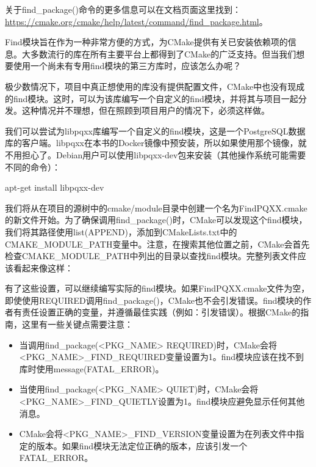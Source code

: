 关于find\_package()命令的更多信息可以在文档页面这里找到：\url{https://cmake.org/cmake/help/latest/command/find_package.html}。

Find模块旨在作为一种非常方便的方式，为CMake提供有关已安装依赖项的信息。大多数流行的库在所有主要平台上都得到了CMake的广泛支持。但当我们想要使用一个尚未有专用find模块的第三方库时，应该怎么办呢？


极少数情况下，项目中真正想使用的库没有提供配置文件，CMake中也没有现成的find模块。这时，可以为该库编写一个自定义的find模块，并将其与项目一起分发。这种情况并不理想，但在照顾到项目用户的情况下，必须这样做。

我们可以尝试为libpqxx库编写一个自定义的find模块，这是一个PostgreSQL数据库的客户端。libpqxx在本书的Docker镜像中预安装，所以如果使用那个镜像，就不用担心了。Debian用户可以使用libpqxx-dev包来安装（其他操作系统可能需要不同的命令）：

\begin{shell}
apt-get install libpqxx-dev
\end{shell}

我们将从在项目的源树中的cmake/module目录中创建一个名为FindPQXX.cmake的新文件开始。为了确保调用find\_package()时，CMake可以发现这个find模块，我们将其路径使用list(APPEND)，添加到CMakeLists.txt中的CMAKE\_MODULE\_PATH变量中。注意，在搜索其他位置之前，CMake会首先检查CMAKE\_MODULE\_PATH中列出的目录以查找find模块。完整列表文件应该看起来像这样：



有了这些设置，可以继续编写实际的find模块。如果FindPQXX.cmake文件为空，即使使用REQUIRED调用find\_package()，CMake也不会引发错误。find模块的作者有责任设置正确的变量，并遵循最佳实践（例如：引发错误）。根据CMake的指南，这里有一些关键点需要注意：

\begin{itemize}
\item
当调用find\_package(<PKG\_NAME> REQUIRED)时，CMake会将<PKG\_NAME>\_FIND\_REQUIRED变量设置为1。find模块应该在找不到库时使用message(FATAL\_ERROR)。

\item
当使用find\_package(<PKG\_NAME> QUIET)时，CMake会将<PKG\_NAME>\_FIND\_QUIETLY设置为1。find模块应避免显示任何其他消息。

\item
CMake会将<PKG\_NAME>\_FIND\_VERSION变量设置为在列表文件中指定的版本。如果find模块无法定位正确的版本，应该引发一个FATAL\_ERROR。
\end{itemize}

